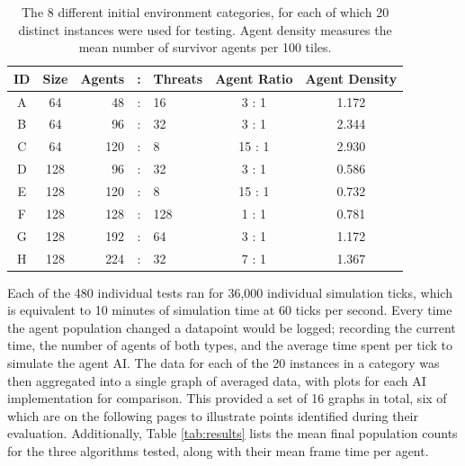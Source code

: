 \documentclass[a4paper,12pt]{article}
\begin{document}
\begin{table}[ht]
\centering
\begin{tabular}{|c|c|rcl|c|c|} \hline
{\bf ID} & {\bf Size} & {\bf Agents} & : & {\bf Threats} & {\bf Agent Ratio} & {\bf Agent Density} \\ \hline
A & 64 & 48 & : & 16 & 3 : 1 & 1.172 \\
B & 64 & 96 & : & 32 & 3 : 1 & 2.344 \\
C & 64 & 120 & : & 8 & 15 : 1 & 2.930 \\ \hline
D & 128 & 96 & : & 32 & 3 : 1 & 0.586 \\
E & 128 & 120 & : & 8 & 15 : 1 & 0.732 \\
F & 128 & 128 & : & 128 & 1 : 1 & 0.781 \\
G & 128 & 192 & : & 64 & 3 : 1 & 1.172 \\
H & 128 & 224 & : & 32 & 7 : 1 & 1.367 \\ \hline
\end{tabular}
\caption{The 8 different initial environment categories, for each of which 20 distinct instances were used for testing. Agent density measures the mean number of survivor agents per 100 tiles.}
\label{tab:environs}
\end{table}

Each of the 480 individual tests ran for 36,000 individual simulation ticks, which is equivalent to 10 minutes of simulation time at 60 ticks per second. Every time the agent population changed a datapoint would be logged; recording the current time, the number of agents of both types, and the average time spent per tick to simulate the agent AI. The data for each of the 20 instances in a category was then aggregated into a single graph of averaged data, with plots for each AI implementation for comparison. This provided a set of 16 graphs in total, six of which are on the following pages to illustrate points identified during their evaluation. Additionally, Table \ref{tab:results} lists the mean final population counts for the three algorithms tested, along with their mean frame time per agent.
\end{document}
